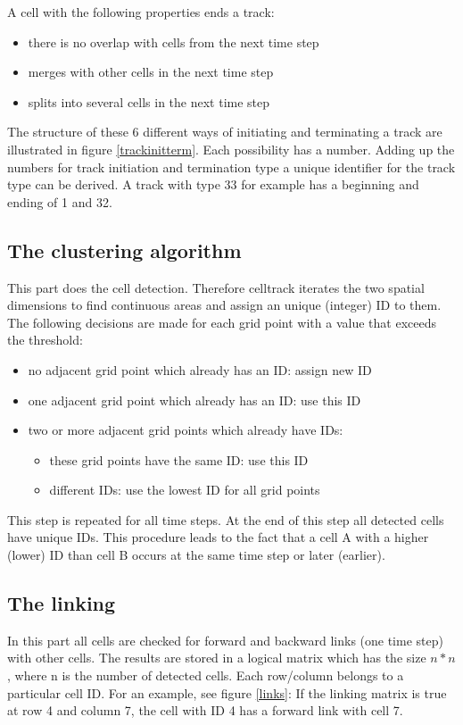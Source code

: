 \documentclass{scrartcl}
\begin{document}
 A cell with the following properties ends a track:
\begin{itemize}
	\item there is no overlap with cells from the next time step
	\item merges with other cells in the next time step
	\item splits into several cells in the next time step
\end{itemize}
The structure of these 6 different ways of initiating and terminating a track are illustrated in figure \ref{trackinitterm}. Each possibility has a number. Adding up the numbers for track initiation and termination type a unique identifier for the track type can be derived. A track with type 33 for example has a beginning and ending of 1 and 32. 

\subsection{The clustering algorithm}
This part does the cell detection. Therefore celltrack iterates the two spatial dimensions to find continuous areas and assign an unique (integer) ID to them. The following decisions are made for each grid point with a value that exceeds the threshold:
\begin{itemize}
	\item no adjacent grid point which already has an ID: assign new ID
	\item one adjacent grid point which already has an ID: use this ID
	\item two or more adjacent grid points which already have  IDs:
	\begin{itemize}
		\item these grid points have the same ID: use this ID
		\item different IDs: use the lowest ID for all grid points
	\end{itemize}
\end{itemize}
This step is repeated for all time steps. At the end of this step all detected cells have unique IDs. This procedure leads to the fact that a cell A with a higher (lower) ID than cell B occurs at the same time step or later (earlier).

\subsection{The linking}
In this part all cells are checked for forward and backward links (one time step) with other cells. The results are stored in a logical matrix which has the size $n * n$, where n is the number of detected cells. Each row/column belongs to a particular cell ID. For an example, see figure \ref{links}: If the linking matrix is true at row 4 and column 7, the cell with ID 4 has a forward link with cell 7.
\end{document}
